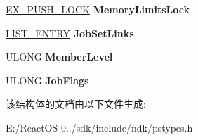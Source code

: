 \begin{DoxyCompactItemize}
\mbox{\label{struct___e_j_o_b_ab79a36d44db2eecd0769a5a57dfd6c6b}} 
\hyperlink{struct___e_x___p_u_s_h___l_o_c_k}{E\+X\+\_\+\+P\+U\+S\+H\+\_\+\+L\+O\+CK} {\bfseries Memory\+Limits\+Lock}
\item 
\mbox{\label{struct___e_j_o_b_aee92cfb66e96a96c595dc62947156c08}} 
\hyperlink{struct___l_i_s_t___e_n_t_r_y}{L\+I\+S\+T\+\_\+\+E\+N\+T\+RY} {\bfseries Job\+Set\+Links}
\item 
\mbox{\label{struct___e_j_o_b_af18bc46f01dd2e062292b7517aa32f0f}} 
U\+L\+O\+NG {\bfseries Member\+Level}
\item 
\mbox{\label{struct___e_j_o_b_a8be013099c42b551c1bbe06e33757d9d}} 
U\+L\+O\+NG {\bfseries Job\+Flags}
\end{DoxyCompactItemize}


该结构体的文档由以下文件生成\+:\begin{DoxyCompactItemize}
\item 
E\+:/\+React\+O\+S-\/0../sdk/include/ndk/pstypes.\+h\end{DoxyCompactItemize}
